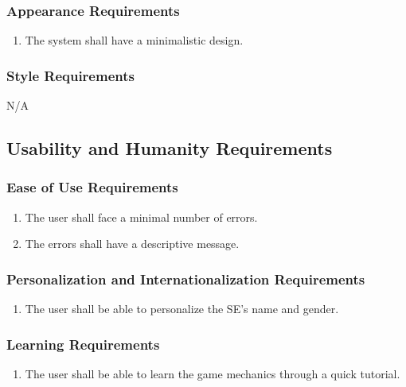\documentclass[]{article}
\begin{document}
\subsubsection{Appearance Requirements}
\label{ssub:appearance_requirements}
\begin{enumerate}[start=1, label={LF\arabic*.}]
	\item The system shall have a minimalistic design.
\end{enumerate}

\subsubsection{Style Requirements}
\label{ssub:style_requirements}
N/A

\subsection{Usability and Humanity Requirements}
\label{sub:usability_and_humanity_requirements}

\subsubsection{Ease of Use Requirements}
\label{ssub:ease_of_use_requirements}
\begin{enumerate}[start=1, label={UH\arabic*.}]
	\item The user shall face a minimal number of errors. 
	\item The errors shall have a descriptive message.
\end{enumerate}

\subsubsection{Personalization and Internationalization Requirements}
\label{ssub:personalization_and_internationalization_requirements}
\begin{enumerate}[start=3, label={UH\arabic*.}]
	\item The user shall be able to personalize the SE’s name and gender.
\end{enumerate}

\subsubsection{Learning Requirements}
\label{ssub:learning_requirements}
\begin{enumerate}[start=4, label={UH\arabic*.}]
    \item The user shall be able to learn the game mechanics through a quick 
    tutorial.
\end{enumerate}
\end{document}
